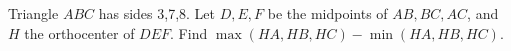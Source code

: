 Triangle $ABC$ has sides 3,7,8. Let $D,E,F$ be the midpoints of $AB,BC,AC$, and $H$ the orthocenter of $DEF$. Find $\max(HA,HB,HC)-\min(HA,HB,HC)$.
